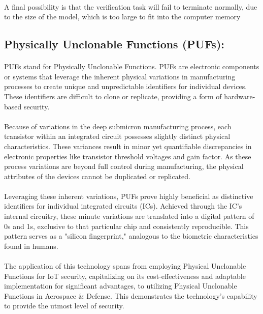 \begin{enumerate}
\begin{itemize}
		\paragraph*{}
		A final possibility is that the verification task will fail to terminate normally, due to the size of the model, which is too large to fit into the computer memory
				
	\end{itemize} 
	
\end{enumerate}

\subsection{Physically Unclonable Functions (PUFs):}
\paragraph*{}
PUFs stand for Physically Unclonable Functions. PUFs are electronic components or systems that leverage the inherent physical variations in manufacturing processes to create unique and unpredictable identifiers for individual devices. These identifiers are difficult to clone or replicate, providing a form of hardware-based security.
\paragraph*{}
Because of variations in the deep submicron manufacturing process, each transistor within an integrated circuit possesses slightly distinct physical characteristics. These variances result in minor yet quantifiable discrepancies in electronic properties like transistor threshold voltages and gain factor. As these process variations are beyond full control during manufacturing, the physical attributes of the devices cannot be duplicated or replicated.
\paragraph*{}
Leveraging these inherent variations, PUFs prove highly beneficial as distinctive identifiers for individual integrated circuits (ICs). Achieved through the IC's internal circuitry, these minute variations are translated into a digital pattern of 0s and 1s, exclusive to that particular chip and consistently reproducible. This pattern serves as a "silicon fingerprint," analogous to the biometric characteristics found in humans.
\paragraph*{}
The application of this technology spans from employing Physical Unclonable Functions for IoT security, capitalizing on its cost-effectiveness and adaptable implementation for significant advantages, to utilizing Physical Unclonable Functions in Aerospace \& Defense. This demonstrates the technology's capability to provide the utmost level of security.
